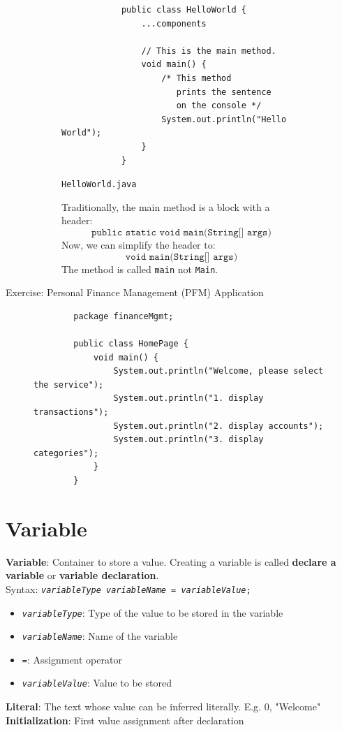 \documentclass{article}
\begin{document}
\begin{figure}[h!]
	\centering
	\begin{subfigure}[h]{.5\textwidth}
		\begin{verbatim}
			public class HelloWorld {
			    ...components
			    
			    // This is the main method.
			    void main() {
			        /* This method
			           prints the sentence
			           on the console */
			        System.out.println("Hello World");
			    }
			}
		\end{verbatim}
		\caption{\texttt{HelloWorld.java}}
	\end{subfigure}
	\begin{subfigure}[h]{.45\textwidth}
		Traditionally, the main method is a block with a header:
		\begin{equation*}
			\texttt{public static void main(String[] args)}
		\end{equation*}
		Now, we can simplify the header to:
		\begin{equation*}
			\texttt{void main(String[] args)}
		\end{equation*}
		The method is called \texttt{main} not \texttt{Main}.
	\end{subfigure}
\end{figure}

Exercise: Personal Finance Management (PFM) Application

\begin{figure}[h!]
	\centering
	\begin{verbatim}
		package financeMgmt;
		
		public class HomePage {
		    void main() {
		        System.out.println("Welcome, please select the service");
		        System.out.println("1. display transactions");
		        System.out.println("2. display accounts");
		        System.out.println("3. display categories");
		    }
		}
	\end{verbatim}
\end{figure}
\newpage

\section{Variable}
\textbf{Variable}: Container to store a value. Creating a variable is called \textbf{declare a variable} or \textbf{variable declaration}.\\
Syntax: \texttt{\textit{variableType} \textit{variableName} = \textit{variableValue};}
\begin{itemize}
	\item \texttt{\textit{variableType}}: Type of the value to be stored in the variable
	\item \texttt{\textit{variableName}}: Name of the variable
	\item \texttt{=}: Assignment operator
	\item \texttt{\textit{variableValue}}: Value to be stored
\end{itemize}
\textbf{Literal}: The text whose value can be inferred literally. E.g. 0, "Welcome"\\
\textbf{Initialization}: First value assignment after declaration
\end{document}
